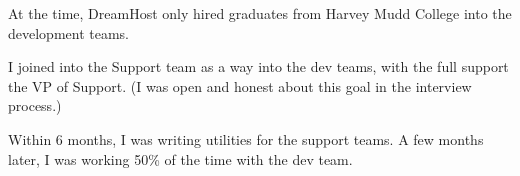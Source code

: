 \item At the time, DreamHost only hired graduates from Harvey Mudd College into the development teams.
\item I joined into the Support team as a way into the dev teams, with the full support the VP of Support. (I was open and honest about this goal in the interview process.)
\item Within 6 months, I was writing utilities for the support teams. A few months later, I was working 50\% of the time with the dev team.
